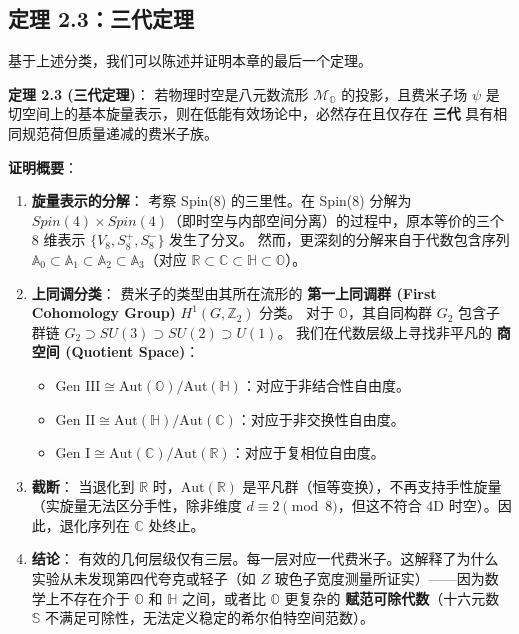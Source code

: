 \subsection{定理 2.3：三代定理}

基于上述分类，我们可以陈述并证明本章的最后一个定理。

\textbf{定理 2.3 (三代定理)}：
若物理时空是八元数流形 $\mathcal{M}_\mathbb{O}$ 的投影，且费米子场 $\psi$ 是切空间上的基本旋量表示，则在低能有效场论中，必然存在且仅存在 \textbf{三代} 具有相同规范荷但质量递减的费米子族。

\textbf{证明概要}：

\begin{enumerate}
\item \textbf{旋量表示的分解}：
   考察 Spin(8) 的三里性。在 Spin(8) 分解为 $Spin(4) \times Spin(4)$（即时空与内部空间分离）的过程中，原本等价的三个 8 维表示 $\{V_8, S_8^+, S_8^-\}$ 发生了分叉。
   然而，更深刻的分解来自于代数包含序列 $\mathbb{A}_0 \subset \mathbb{A}_1 \subset \mathbb{A}_2 \subset \mathbb{A}_3$（对应 $\mathbb{R} \subset \mathbb{C} \subset \mathbb{H} \subset \mathbb{O}$）。

\item \textbf{上同调分类}：
   费米子的类型由其所在流形的 \textbf{第一上同调群 (First Cohomology Group)} $H^1(G, \mathbb{Z}_2)$ 分类。
   对于 $\mathbb{O}$，其自同构群 $G_2$ 包含子群链 $G_2 \supset SU(3) \supset SU(2) \supset U(1)$。
   我们在代数层级上寻找非平凡的 \textbf{商空间 (Quotient Space)}：
   \begin{itemize}
   \item $\text{Gen III} \cong \text{Aut}(\mathbb{O}) / \text{Aut}(\mathbb{H})$：对应于非结合性自由度。
   \item $\text{Gen II} \cong \text{Aut}(\mathbb{H}) / \text{Aut}(\mathbb{C})$：对应于非交换性自由度。
   \item $\text{Gen I} \cong \text{Aut}(\mathbb{C}) / \text{Aut}(\mathbb{R})$：对应于复相位自由度。
   \end{itemize}

\item \textbf{截断}：
   当退化到 $\mathbb{R}$ 时，$\text{Aut}(\mathbb{R})$ 是平凡群（恒等变换），不再支持手性旋量（实旋量无法区分手性，除非维度 $d \equiv 2 \pmod 8$，但这不符合 4D 时空）。因此，退化序列在 $\mathbb{C}$ 处终止。

\item \textbf{结论}：
   有效的几何层级仅有三层。每一层对应一代费米子。这解释了为什么实验从未发现第四代夸克或轻子（如 $Z$ 玻色子宽度测量所证实）——因为数学上不存在介于 $\mathbb{O}$ 和 $\mathbb{H}$ 之间，或者比 $\mathbb{O}$ 更复杂的 \textbf{赋范可除代数}（十六元数 $\mathbb{S}$ 不满足可除性，无法定义稳定的希尔伯特空间范数）。
\end{enumerate}

